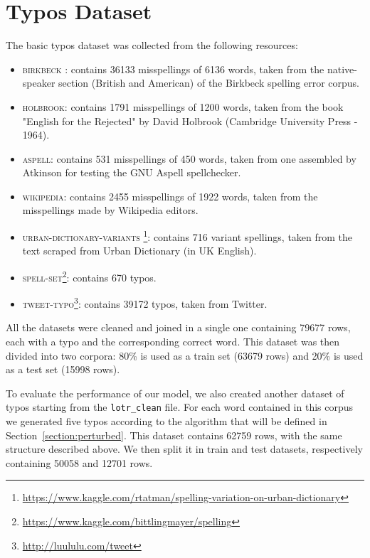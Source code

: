 \section{Typos Dataset}
The basic typos dataset was collected from the following resources:
\begin{itemize}
	\item \textsc{birkbeck} : contains 
	\num{36133} misspellings of \num{6136} words, taken from the native-speaker section (British and 
	American) of the Birkbeck spelling error corpus.
	\item \textsc{holbrook}: contains \num{1791} misspellings of \num{1200} words, taken from 
	the book "English for the Rejected" by David Holbrook (Cambridge University Press - 1964).
	\item \textsc{aspell}: contains \num{531} misspellings of \num{450} words, taken from one 
	assembled by Atkinson for testing the GNU Aspell spellchecker.
	\item \textsc{wikipedia}: contains \num{2455} misspellings of \num{1922} words, taken from 
	the misspellings made by Wikipedia editors.
	\item \textsc{urban-dictionary-variants} 
	\footnote{\url{https://www.kaggle.com/rtatman/spelling-variation-on-urban-dictionary}}: contains 
	\num{716} variant 
	spellings, taken from the text scraped from Urban Dictionary (in UK English).
	\item \textsc{spell-set}\footnote{\url{https://www.kaggle.com/bittlingmayer/spelling}}: contains 
	\num{670} typos.
	\item \textsc{tweet-typo}\footnote{\url{http://luululu.com/tweet}}: contains \num{39172} typos, taken 
	from Twitter.
\end{itemize}

All the datasets were cleaned and joined in a single one containing \num{79677} rows, each with a typo and the 
corresponding correct word.
This dataset was then divided into two corpora: \num{80}\% is used as a train set (\num{63679} rows) and 
\num{20}\% is used as a test set (\num{15998} rows).

To evaluate the performance of our model, we also created another dataset of typos starting from the \texttt{lotr\_clean} 
file. For each word contained in this corpus we generated five typos according to the algorithm 
that will be defined in Section~\ref{section:perturbed}. This dataset contains \num{62759} rows, with the same 
structure described above. We then split it in train and test datasets, respectively containing \num{50058} and 
\num{12701} rows.

